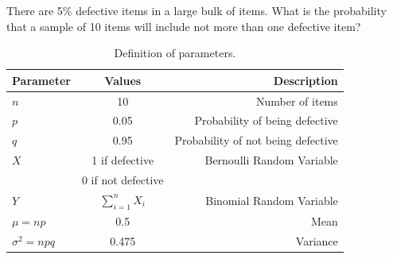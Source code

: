 \documentclass[]{article}
\begin{document}
\providecommand{\qfunc}[1]{\ensuremath{Q\left(#1\right)}}
\providecommand{\gauss}[2]{\mathcal{N}\ensuremath{\left(#1,#2\right)}}
\providecommand{\diff}[2]{\ensuremath{\frac{d{#1}}{d{#2}}}}
\providecommand{\myceil}[1]{\left \lceil #1 \right \rceil }
\newcommand\figref{Fig.~\ref}
\newcommand\tabref{Table~\ref}
\newcommand{\sinc}{\,\text{sinc}\,}
\newcommand{\rect}{\,\text{rect}\,}

\let\vec\mathbf

There are 5\% defective items in a large bulk of items. What is the probability 
that a sample of 10 items will include not more than one defective item?
\solution
\begin{table}[!ht]
\centering
\begin{tabular}{|l|c|r|}
    \hline
    Parameter & Values & Description\\
    \hline
    $n$ & 10 & Number of items\\
    \hline
    $p$ & 0.05 & Probability of being defective\\
    \hline
    $q$ & 0.95 & Probability of not being defective\\
    \hline
    $X$ & 1 if defective & Bernoulli Random Variable\\
    {} & 0 if not defective & {}\\
    \hline
    $Y$ & $\sum_{i=1}^nX_i$ & Binomial Random Variable\\
    \hline
    $\mu = np$ & 0.5 & Mean\\
    \hline
    ${\sigma}^2 = npq$ & 0.475 & Variance\\
    \hline
\end{tabular}
\caption{Definition of parameters.}
\label{tab:gaussian/9/3/7}
\end{table}
\end{document}
